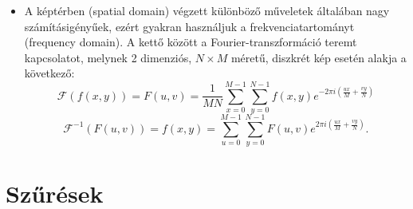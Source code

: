 \documentclass[12pt]{article}
\theoremstyle{plain}
\begin{document}
\begin{itemize}
\item A képtérben (spatial domain) végzett különböző műveletek általában nagy számításigényűek, ezért gyakran használjuk a frekvenciatartományt (frequency domain). A kettő között a Fourier-transzformáció teremt kapcsolatot, melynek 2 dimenziós, $N \times M$ méretű, diszkrét kép esetén alakja a következő:
$$\mathcal{F}(f(x,y)) = F(u,v) = \frac{1}{MN}\sum^{M-1}_{x=0}\sum^{N-1}_{y=0}f(x,y)e^{-2\pi i(\frac{ux}{M} + \frac{vy}{N})}$$
$$\mathcal{F}^{-1}(F(u,v)) = f(x,y) = \sum^{M-1}_{u=0}\sum^{N-1}_{y=0}F(u,v)e^{2\pi i(\frac{ux}{M} + \frac{vy}{N})}.$$

\end{itemize}{}




\section{Szűrések}
\end{document}
